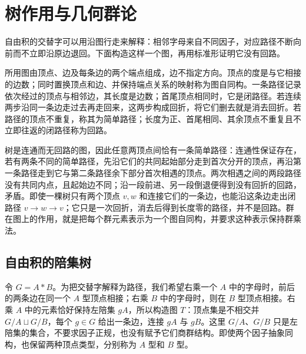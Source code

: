 
\section{树作用与几何群论}
\label{b1:sec:C02}

自由积的交替字可以用沿图行走来解释：相邻字母来自不同因子，对应路径不断向前而不立即沿原边退回。下面构造这样一个图，再用标准形证明它没有回路。

\ProseParagraphBreak
所用图由顶点、边及每条边的两个端点组成，边不指定方向。顶点的度是与它相接的边数；同时置换顶点和边、并保持端点关系的映射称为图自同构。一条路径记录依次经过的顶点与相邻边，其长度是边数；首尾顶点相同时，它是闭路径。若连续两步沿同一条边走过去再走回来，这两步构成回折，将它们删去就是消去回折。若路径的顶点不重复，称其为简单路径；长度为正、首尾相同、其余顶点不重复且不立即往返的闭路径称为回路。

\ProseParagraphBreak
树是连通而无回路的图，因此任意两顶点间恰有一条简单路径：连通性保证存在，若有两条不同的简单路径，先沿它们的共同起始部分走到首次分开的顶点，再沿第一条路径走到它与第二条路径余下部分首次相遇的顶点。两次相遇之间的两段路径没有共同内点，且起始边不同；沿一段前进、另一段倒退便得到没有回折的回路，矛盾。即使一棵树只有两个顶点 \(v,w\) 和连接它们的一条边，也能沿这条边走出闭路径 \(v\to w\to v\)；它只是一次回折，消去后得到长度零的路径，并不是回路。群在图上的作用，就是把每个群元素表示为一个图自同构，并要求这种表示保持群乘法。

\subsection{自由积的陪集树}
\label{b1:subsec:C02:01}

令 \(G=A*B\)。为把交替字解释为路径，我们希望右乘一个 \(A\) 中的字母时，前后的两条边在同一个 \(A\) 型顶点相接；右乘 \(B\) 中的字母时，则在 \(B\) 型顶点相接。右乘 \(A\) 中的元素恰好保持左陪集 \(gA\)，所以构造图 \(T\)：顶点集是不相交并 \(G/A\sqcup G/B\)，每个 \(g\in G\) 给出一条边，连接 \(gA\) 与 \(gB\)。这里 \(G/A\)、\(G/B\) 只是左陪集的集合，不要求因子正规，也没有赋予它们商群结构。即使两个因子抽象同构，也保留两种顶点类型，分别称为 \(A\) 型和 \(B\) 型。

